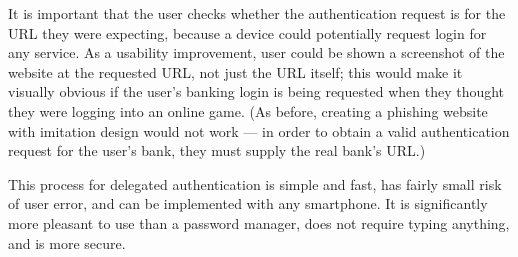 It is important that the user checks whether the authentication request is for the URL they were
expecting, because a device could potentially request login for any service. As a usability
improvement, user could be shown a screenshot of the website at the requested URL, not just the URL
itself; this would make it visually obvious if the user's banking login is being requested when they
thought they were logging into an online game. (As before, creating a phishing website with
imitation design would not work --- in order to obtain a valid authentication request for the user's
bank, they must supply the real bank's URL.)

This process for delegated authentication is simple and fast, has fairly small risk of user error,
and can be implemented with any smartphone. It is significantly more pleasant to use than a password
manager, does not require typing anything, and is more secure.
